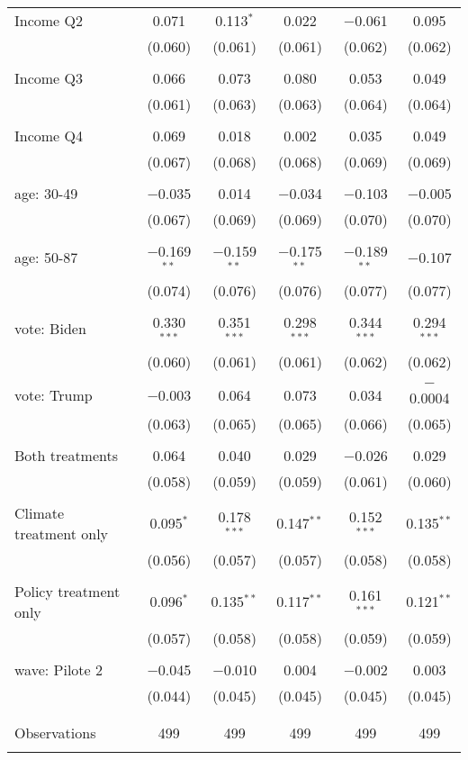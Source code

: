 \begin{tabular}{@{\extracolsep{5pt}}lccccc}
 Income Q2 & 0.071 & 0.113$^{*}$ & 0.022 & $-$0.061 & 0.095 \\ 
  & (0.060) & (0.061) & (0.061) & (0.062) & (0.062) \\ 
  & & & & & \\ 
 Income Q3 & 0.066 & 0.073 & 0.080 & 0.053 & 0.049 \\ 
  & (0.061) & (0.063) & (0.063) & (0.064) & (0.064) \\ 
  & & & & & \\ 
 Income Q4 & 0.069 & 0.018 & 0.002 & 0.035 & 0.049 \\ 
  & (0.067) & (0.068) & (0.068) & (0.069) & (0.069) \\ 
  & & & & & \\ 
 age: 30-49 & $-$0.035 & 0.014 & $-$0.034 & $-$0.103 & $-$0.005 \\ 
  & (0.067) & (0.069) & (0.069) & (0.070) & (0.070) \\ 
  & & & & & \\ 
 age: 50-87 & $-$0.169$^{**}$ & $-$0.159$^{**}$ & $-$0.175$^{**}$ & $-$0.189$^{**}$ & $-$0.107 \\ 
  & (0.074) & (0.076) & (0.076) & (0.077) & (0.077) \\ 
  & & & & & \\ 
 vote: Biden & 0.330$^{***}$ & 0.351$^{***}$ & 0.298$^{***}$ & 0.344$^{***}$ & 0.294$^{***}$ \\ 
  & (0.060) & (0.061) & (0.061) & (0.062) & (0.062) \\ 
  & & & & & \\ 
 vote: Trump & $-$0.003 & 0.064 & 0.073 & 0.034 & $-$0.0004 \\ 
  & (0.063) & (0.065) & (0.065) & (0.066) & (0.065) \\ 
  & & & & & \\ 
 Both treatments & 0.064 & 0.040 & 0.029 & $-$0.026 & 0.029 \\ 
  & (0.058) & (0.059) & (0.059) & (0.061) & (0.060) \\ 
  & & & & & \\ 
 Climate treatment only & 0.095$^{*}$ & 0.178$^{***}$ & 0.147$^{**}$ & 0.152$^{***}$ & 0.135$^{**}$ \\ 
  & (0.056) & (0.057) & (0.057) & (0.058) & (0.058) \\ 
  & & & & & \\ 
 Policy treatment only & 0.096$^{*}$ & 0.135$^{**}$ & 0.117$^{**}$ & 0.161$^{***}$ & 0.121$^{**}$ \\ 
  & (0.057) & (0.058) & (0.058) & (0.059) & (0.059) \\ 
  & & & & & \\ 
 wave: Pilote 2 & $-$0.045 & $-$0.010 & 0.004 & $-$0.002 & 0.003 \\ 
  & (0.044) & (0.045) & (0.045) & (0.045) & (0.045) \\ 
  & & & & & \\ 
\hline \\[-1.8ex] 

Observations & 499 & 499 & 499 & 499 & 499 \\ 
\hline 
\hline \\[-1.8ex] 
\end{tabular} 